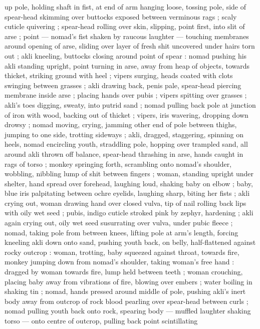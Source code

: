 up pole, holding shaft in fist, at end of arm hanging loose, tossing 
pole, side of spear-head skimming over buttocks exposed between 
verminous rags ; scaly cuticle quivering ; spear-head rolling over 
skin, slipping, point first, into slit of arse ; point --- nomad's fist 
shaken by raucous laughter --- touching membranes around opening 
of arse, sliding over layer of fresh shit uncovered under hairs torn 
out ; akli kneeling, buttocks closing around point of spear : nomad 
pushing his akli standing upright, point turning in arse, away from 
heap of objects, towards thicket, striking ground with heel ; vipers 
surging, heads coated with clots swinging between grasses ; akli 
drawing back, penis pale, spear-head piercing membrane inside arse 
; placing hands over pubis ; vipers spitting over grasses ; akli's toes 
digging, sweaty, into putrid sand ; nomad pulling back pole at 
junction of iron with wood, backing out of thicket ; vipers, iris 
wavering, dropping down drowsy ; nomad moving, crying, jamming 
other end of pole between thighs, jumping to one side, trotting 
sideways ; akli, dragged, staggering, spinning on heels, nomad 
encircling youth, straddling pole, hopping over trampled sand, all 
around akli thrown off balance, spear-head thrashing in arse, hands 
caught in rags of torso ; monkey springing forth, scrambling onto 
nomad's shoulder, wobbling, nibbling lump of shit between fingers ; 
woman, standing upright under shelter, hand spread over forehead, 
laughing loud, shaking baby on elbow ; baby, blue iris palpitating 
between ochre eyelids, laughing sharp, biting her fists ; akli crying 
out, woman drawing hand over closed vulva, tip of nail rolling back 
lips with oily wet seed ; pubis, indigo cuticle stroked pink by zephyr, 
hardening ; akli again crying out, oily wet seed susurrating over 
vulva, under pubic fleece ; nomad, taking pole from between knees, 
lifting pole at arm's length, forcing kneeling akli down onto sand, 
pushing youth back, on belly, half-flattened against rocky outcrop : 
woman, trotting, baby squeezed against throat, towards fire, monkey 
jumping down from nomad's shoulder, taking woman's free hand : 
dragged by woman towards fire, lump held between teeth ; woman 
crouching, placing baby away from vibrations of fire, blowing over 
embers ; water boiling in shaking tin ; nomad, hands pressed around 
middle of pole, pushing akli's inert body away from outcrop of rock 
{\col} blood pearling over spear-head between curls ; nomad pulling 
youth back onto rock, spearing body --- muffled laughter shaking 
torso --- onto centre of outcrop, pulling back point scintillating 
